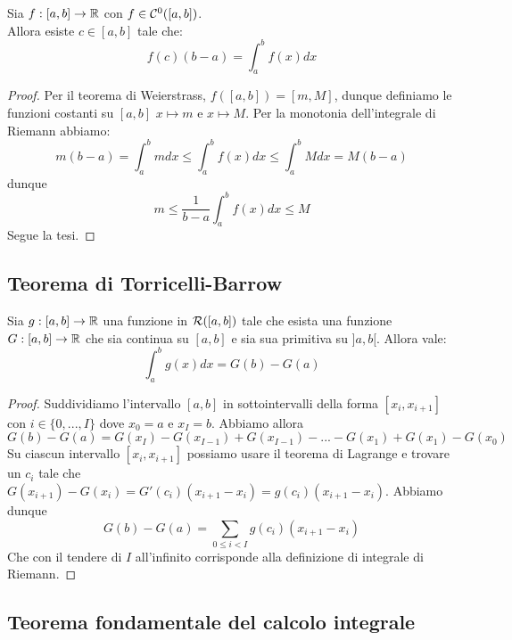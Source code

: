 \documentclass{article}
\begin{document}
\begin{theorem}{}{}
    Sia $f : [a, b] \to \mathbb{R}$ con $f \in \mathcal{C}^0([a,b])$.\\
    Allora esiste $c \in [a,b]$ tale che:
    \[f(c)(b-a) =\int_a^b f(x)d x\]
\end{theorem}
\begin{proof}
    Per il teorema di Weierstrass, $f([a,b]) = [m,M]$, dunque definiamo le funzioni costanti su $[a,b]$ $x\mapsto m$ e $x\mapsto M$. Per la monotonia dell'integrale di Riemann abbiamo:
    \[m(b-a)=\int_a^b m d x \le \int_a^b f(x) d x \le \int_a^b M d x = M(b-a)\]
    dunque 
    \[m \le \frac{1}{b-a}\int_a^b f(x) d x \le M\]
    Segue la tesi.
\end{proof}

\subsection{Teorema di Torricelli-Barrow}

\begin{theorem}{}{}
    Sia $g : [a,b]\to \mathbb{R}$ una funzione in $\mathcal{R}([a,b])$ tale che esista una funzione $G:[a,b]\to \mathbb{R}$ che sia continua su $[a,b]$ e sia sua primitiva su $]a,b[$. Allora vale:
    \[\int_a^b g(x) d x = G(b)-G(a)\]
\end{theorem}
\begin{proof}
    Suddividiamo l'intervallo $[a,b]$ in sottointervalli della forma $[x_i, x_{i+1}]$ con $i \in \{0,...,I\}$ dove $x_0 = a$ e $x_I = b$. Abbiamo allora
    \[G(b)-G(a) = G(x_I) - G(x_{I-1}) + G(x_{I-1}) - ... - G(x_1) + G(x_1) - G(x_0)\]
    Su ciascun intervallo $[x_i, x_{i+1}]$ possiamo usare il teorema di Lagrange e trovare un $c_i$ tale che $G(x_{i+1}) - G(x_i) = G'(c_i)(x_{i+1}-x_i) = g(c_i)(x_{i+1}-x_i)$. Abbiamo dunque
    \[G(b)-G(a) = \sum_{0\le i < I } g(c_i)(x_{i+1}-x_i)\]
    Che con il tendere di $I$ all'infinito corrisponde alla definizione di integrale di Riemann.
\end{proof}

\subsection{Teorema fondamentale del calcolo integrale}
\end{document}
